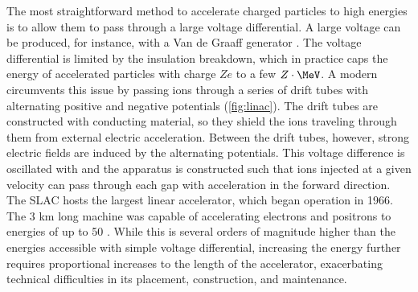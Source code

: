 The most straightforward method to accelerate charged particles to high energies is to allow them to pass through a large voltage differential.
A large voltage can be produced, for instance, with a Van de Graaff generator \cite{PhysRev.43.149}.
The voltage differential is limited by the insulation breakdown, which in practice caps the energy of accelerated particles with charge $Ze$ to a few $Z \cdot\MeV$.
A modern \linac circumvents this issue by passing ions through a series of drift tubes with alternating positive and negative potentials (\cref{fig:linac}).
The drift tubes are constructed with conducting material, so they shield the ions traveling through them from external electric acceleration.
Between the drift tubes, however, strong electric fields are induced by the alternating potentials.
This voltage difference is oscillated with \rf and the apparatus is constructed such that ions injected at a given velocity can pass through each gap with acceleration in the forward direction.
The \ac{SLAC} hosts the largest linear accelerator, which began operation in 1966.
The 3 km long machine was capable of accelerating electrons and positrons to energies of up to 50 \GeV.
While this is several orders of magnitude higher than the energies accessible with simple voltage differential, increasing the energy further requires proportional increases to the length of the accelerator, exacerbating technical difficulties in its placement, construction, and maintenance.

